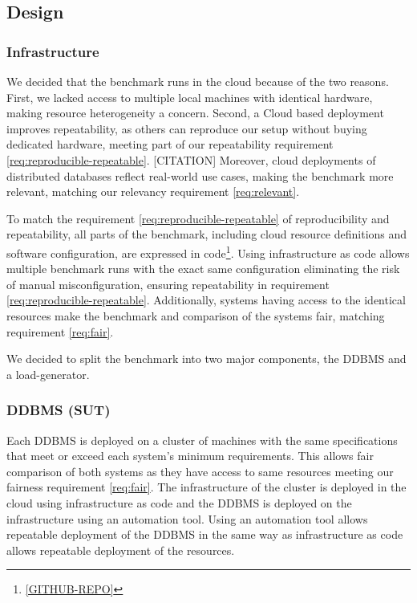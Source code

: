 \subsection{Design}

\subsubsection{Infrastructure}
We decided that the benchmark runs in the cloud because of the two reasons.
First, we lacked access to multiple local machines with identical hardware, making resource heterogeneity a concern.
Second, a Cloud based deployment improves repeatability, as others can reproduce our setup without buying dedicated hardware, meeting part of our repeatability requirement \ref{req:reproducible-repeatable}.
[CITATION]
Moreover, cloud deployments of distributed databases reflect real-world use cases, making the benchmark more relevant, matching our relevancy requirement \ref{req:relevant}.

To match the requirement \ref{req:reproducible-repeatable} of reproducibility and repeatability, all parts of the benchmark, including cloud resource definitions and software configuration, are expressed in code\footnote{\url{[GITHUB-REPO]}}.
Using infrastructure as code allows multiple benchmark runs with the exact same configuration eliminating the risk of manual misconfiguration, ensuring repeatability in requirement \ref{req:reproducible-repeatable}.
Additionally, systems having access to the identical resources make the benchmark and comparison of the systems fair, matching requirement \ref{req:fair}.

We decided to split the benchmark into two major components, the DDBMS and a load-generator.

\subsubsection{DDBMS (SUT)}

Each DDBMS is deployed on a cluster of machines with the same specifications that meet or exceed each system's minimum requirements.
This allows fair comparison of both systems as they have access to same resources meeting our fairness requirement \ref{req:fair}.
The infrastructure of the cluster is deployed in the cloud using infrastructure as code and the DDBMS is deployed on the infrastructure using an automation tool.
Using an automation tool allows repeatable deployment of the DDBMS in the same way as infrastructure as code allows repeatable deployment of the resources.


